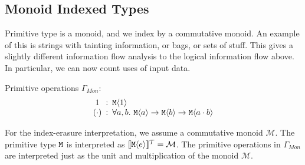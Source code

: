 
\subsection{Monoid Indexed Types}
\label{sec:monoid-indexed-types}

Primitive type is a monoid, and we index by a commutative monoid. An
example of this is strings with tainting information, or bags, or sets
of stuff. This gives a slightly different information flow analysis to
the logical information flow above. In particular, we can now count
uses of input data.

Primitive operations $\Gamma_{\mathit{Mon}}$:
\begin{displaymath}
  \begin{array}{c@{\hspace{0.5em}:\hspace{0.5em}}l}
    1 & \tyPrim{M}{1} \\
    (\cdot) & \forall a,b.\ \tyPrim{M}{a} \to \tyPrim{M}{b} \to \tyPrim{M}{a\cdot b}
  \end{array}
\end{displaymath}

For the index-erasure interpretation, we assume a commutative monoid
$\mathcal{M}$. The primitive type $\texttt{M}$ is interpreted as
$\llbracket \textup{\texttt{M}}\langle e \rangle \rrbracket^{\mathcal{T}} = \mathcal{M}$. The primitive operations in
$\Gamma_{\mathit{Mon}}$ are interpreted just as the unit and multiplication of
the monoid $\mathcal{M}$.



